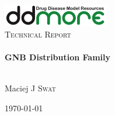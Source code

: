 \begin{titlepage}
\begin{center}

\includegraphics[width=0.35\textwidth]{./logo/ddmore_logo}~\\[1cm]

%
\textsc{\Large Technical Report}\\[0.5cm]

\HRule \\[0.4cm]
{ \huge \bfseries GNB Distribution Family \\[0.4cm] }

\HRule \\[1.5cm]

Maciej J \textsc{Swat}


\vfill

{\large \today \\}

\end{center}
\end{titlepage}